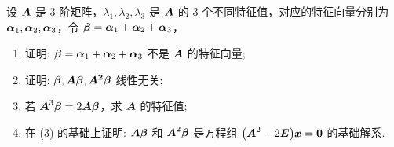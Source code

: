 \begin{example}
    设 $\vb*{A}$ 是 3 阶矩阵，$\lambda_1,\lambda_2,\lambda_3$ 是 $\vb*{A}$ 的 3 个不同特征值，对应的特征向量分别为 $\vb*{\alpha}_1,\vb*{\alpha}_2,\vb*{\alpha}_3$，令 $\vb*{\beta}=\vb*{\alpha}_1+\vb*{\alpha}_2+\vb*{\alpha}_3$，
    \begin{enumerate}[label=(\arabic{*})]
        \item 证明: $\vb*{\beta}=\vb*{\alpha}_1+\vb*{\alpha}_2+\vb*{\alpha}_3$ 不是 $\vb*{A}$ 的特征向量;
        \item 证明: $\vb*{\beta},\vb*{A\beta},\vb*{A^2\beta}$ 线性无关;
        \item 若 $\vb*{A}^3\vb*{\beta}=2\vb*{A\beta}$，求 $\vb*{A}$ 的特征值;
        \item 在 (3) 的基础上证明: $\vb*{A\beta}$ 和 $\vb*{A}^2\vb*{\beta}$ 是方程组 $\qty(\vb*{A}^2-2\vb*{E})\vb*{x}=\vb*{0}$ 的基础解系.
    \end{enumerate}
\end{example}
